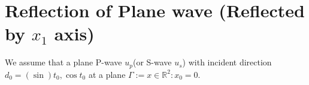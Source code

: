 \documentclass[12pt]{iopart}
\begin{document}
\newcommand{\mL}{\mathscr{L}}
\newcommand{\cT}{{\cal T}}
\newcommand{\cM}{{\cal M}}
\newcommand{\cE}{{\cal E}}
\newcommand{\cL}{{\cal L}}
\newcommand{\cF}{{\cal F}}
\newcommand{\cB}{{\cal B}}
\newcommand{\PML}{{\rm PML}}
\newcommand{\FEM}{{\rm FEM}}
\newcommand{\rd}{\,\mathrm{d}}

\renewcommand{\i}{\mathbf{i}}
\renewcommand{\v}{\mathbf{v}}
\renewcommand{\u}{\mathbf{u}}
\renewcommand{\r}{\mathbf{r}}
\newcommand{\gR}{{\mathbb{R}}}
\newcommand{\Z}{{\mathbb{Z}}}
\newcommand{\C}{{\mathbb{C}}}
\newcommand{\I}{{\mathbb{I}}}
\renewcommand{\Re}{\mathrm{Re}\,}
\renewcommand{\Im}{\mathrm{Im}\,}
\renewcommand{\div}{\mathrm{div}}
\newcommand{\curl}{\mathrm{curl}}
\newcommand{\Curl}{\mathbf{curl}}
\newcommand{\pv}{\mathrm{p.v.}}

\newcommand{\Np}{\mathbb{N}_p}
\newcommand{\Ns}{\mathbb{N}_s}
\newcommand{\Tp}{\mathbb{T}_p}
\newcommand{\Ts}{\mathbb{T}_s}
\newcommand{\Na}{\mathbb{N}_\alpha}
\newcommand{\Nb}{\mathbb{N}_\beta}
\newcommand{\Ta}{\mathbb{T}_\alpha}
\newcommand{\Tb}{\mathbb{T}_\beta}
\newcommand{\GG}{\mathcal{G}}

\newcommand{\N}{\mathbb{N}}
\newcommand{\D}{\mathbb{D}}
\newcommand{\T}{\mathbb{T}}
\newcommand{\A}{\mathbb{A}}
\newcommand{\B}{\mathbb{B}}
\newcommand{\G}{\mathbb{G}}
\newcommand{\F}{\mathbb{F}}
\newcommand{\R}{\mathbb{R}}
\newcommand{\W}{\mathbb{W}}
\newcommand{\V}{\mathbb{V}}
\newcommand{\U}{\mathbb{U}}
\newcommand{\J}{\mathbb{J}}
\newcommand{\Zg}{\mathbb{Z}}
\newcommand{\Gtheta}{\mathbb{\Theta}}
\newcommand{\Gphi}{\mathbb{\Phi}}

\newcommand{\be}{\begin{eqnarray}}
\newcommand{\ee}{\end{eqnarray}}
\newcommand{\ben}{\begin{eqnarray*}}
	\newcommand{\een}{\end{eqnarray*}}
\newcommand{\nn}{\nonumber}
\section{Reflection of Plane wave (Reflected by $x_1$ axis)}
We assume that a plane P-wave  $u_p$(or S-wave $u_s$) with incident direction $d_0=(\sin)t_0, \cos t_0$ at a plane $\Gamma := {x \in \R^2 :
	x _0 = 0}$.
\end{document}
